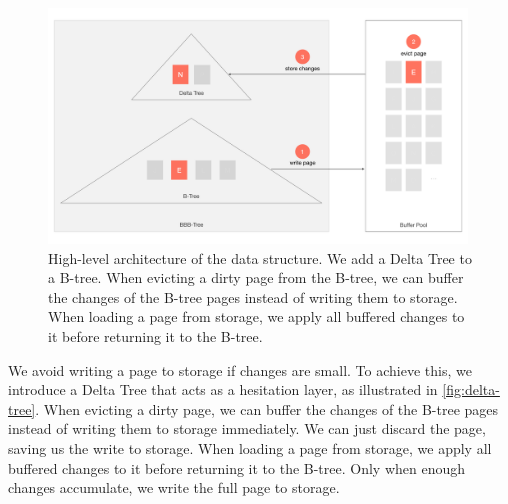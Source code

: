 \begin{figure}[htpb]
  \centering
  \includegraphics[width=0.99\textwidth]{figures/delta_tree.pdf}
  \caption{High-level architecture of the data structure. We add a Delta Tree to a B-tree. When evicting a dirty page from the B-tree, we can buffer the changes of the B-tree pages instead of writing them to storage. When loading a page from storage, we apply all buffered changes to it before returning it to the B-tree.}
  \label{fig:delta-tree}
\end{figure}

We avoid writing a page to storage if changes are small.
To achieve this, we introduce a Delta Tree that acts as a hesitation layer, as illustrated in \autoref{fig:delta-tree}.
When evicting a dirty page, we can buffer the changes of the B-tree pages instead of writing them to storage immediately.
We can just discard the page, saving us the write to storage.
When loading a page from storage, we apply all buffered changes to it before returning it to the B-tree.
Only when enough changes accumulate, we write the full page to storage.

